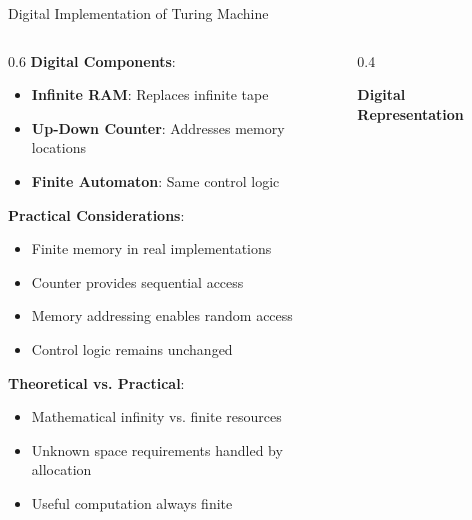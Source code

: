 \documentclass[aspectratio=169]{beamer}
\newcommand{\concept}[1]{\textbf{\color{darkblue}#1}}
\begin{document}
\begin{frame}{Digital Implementation of Turing Machine}
\begin{columns}
\begin{column}{0.6\textwidth}
\concept{Digital Components}:
\begin{itemize}
\item \textbf{Infinite RAM}: Replaces infinite tape
\item \textbf{Up-Down Counter}: Addresses memory locations
\item \textbf{Finite Automaton}: Same control logic
\end{itemize}

\vspace{0.3cm}
\concept{Practical Considerations}:
\begin{itemize}
\item Finite memory in real implementations
\item Counter provides sequential access
\item Memory addressing enables random access
\item Control logic remains unchanged
\end{itemize}

\vspace{0.3cm}
\concept{Theoretical vs. Practical}:
\begin{itemize}
\item Mathematical infinity vs. finite resources
\item Unknown space requirements handled by allocation
\item Useful computation always finite
\end{itemize}
\end{column}
\begin{column}{0.4\textwidth}
\begin{center}
\textbf{Digital Representation}
\vspace{0.3cm}

\end{center}
\end{column}
\end{columns}
\end{frame}
\end{document}
